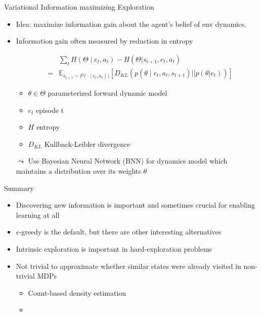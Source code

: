 \documentclass[aspectratio=169]{../latex_main/tntbeamer}  %
\begin{document}
\begin{frame}[c]{Variational Information maximizing Exploration }
	
	\begin{itemize}
		\item Idea: maximize information gain about the agent's belief of env dynamics.
		\item Information gain often measured by reduction in entropy
		
		\begin{eqnarray}
		&&\sum_t H(\Theta \mid e_t, a_t) - H(\Theta | s_{t+1}, e_t, a_t)\nonumber\\
		&=& \mathbb{E}_{s_{t+1}\sim P(\cdot\mid e_t, a_t))} \left[ D_{KL} (p(\theta \mid e_t, a_t, s_{t+1}) || p(\theta|e_t))  \right]\nonumber
		\end{eqnarray}
		
		\begin{itemize}
			\item $\theta \in \Theta$ parameterized forward dynamic model
			\item $e_t$ episode t
			\item $H$ entropy
			\item $D_{KL}$ Kullback-Leibler divergence
		\end{itemize}
	
		\item[$\leadsto$] Use Bayesian Neural Network (BNN) for dynamics model which maintains a distribution over its weights $\theta$
		
	\end{itemize}
	
\end{frame}

\begin{frame}[c]{Summary}
	
	\begin{itemize}
		\item Discovering new information is important and sometimes crucial for enabling learning at all
		\item $\epsilon$-greedy is the default, but there are other interesting alternatives
		\item Intrinsic exploration is important in hard-exploration problems
		\item Not trivial to approximate whether similar states were already visited in non-trivial MDPs
		\begin{itemize}
		    \item Count-based density estimation
		    \item 
		\end{itemize}
	\end{itemize}
	
\end{frame}
\end{document}
